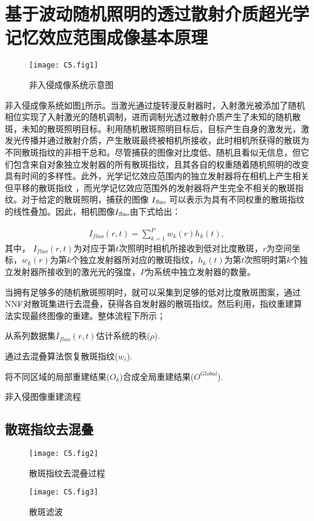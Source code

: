 \section{基于波动随机照明的透过散射介质超光学记忆效应范围成像基本原理}

\begin{figure}[htp]
	\centering
	\texttt{[image: C5.fig1]}
	\caption{非入侵成像系统示意图}
	\label{fig:5.1}
\end{figure}

非入侵成像系统如图\ref{fig:5.1}所示。当激光通过旋转漫反射器时，入射激光被添加了随机相位实现了入射激光的随机调制，进而调制光透过散射介质产生了未知的随机散斑，未知的散斑照明目标。利用随机散斑照明目标后，目标产生自身的激发光，激发光传播并通过散射介质，产生散斑最终被相机所接收，此时相机所获得的散斑为不同散斑指纹的非相干总和。尽管捕获的图像对比度低、随机且看似无信息，但它们包含来自对象独立发射器的所有散斑指纹，且其各自的权重随着随机照明的改变具有时间的多样性。此外，光学记忆效应范围内的独立发射器将在相机上产生相关但平移的散斑指纹 \cite{Freund1988}，而光学记忆效应范围外的发射器将产生完全不相关的散斑指纹。对于给定的散斑照明，捕获的图像 $I_{\textsl{fluo}}$ 可以表示为具有不同权重的散斑指纹的线性叠加。因此，相机图像$I_{\textsl{fluo}}$由下式给出：

\begin{equation}
\begin{aligned}
I_{fluo}(r,t) = \sum^{P}_{k=1} w_{k}(r) h_{k}(t),
\label{eq:5.1}
\end{aligned}
\end{equation}
其中， $I_{fluo}(r,t)$为对应于第$t$次照明时相机所接收到低对比度散斑，$r$为空间坐标，$w_{k}(r)$为第$k$个独立发射器所对应的散斑指纹，$h_{k}(t)$为第$t$次照明时第$k$个独立发射器所接收到的激光光的强度，$P$为系统中独立发射器的数量。

当拥有足够多的随机散斑照明时，就可以采集到足够的低对比度散斑图案，通过NNF对散斑集进行去混叠，获得各自发射器的散斑指纹。然后利用，指纹重建算法实现最终图像的重建。整体流程下所示；
\begin{algorithm2e}[h!]
\DontPrintSemicolon
\SetAlgoLined
{}
从系列数据集$I_{fluo}(r,t)$估计系统的秩($\rho$).\;

通过去混叠算法恢复散斑指纹($w_{i}$).\;


将不同区域的局部重建结果($O_{k}$)合成全局重建结果($O^{Global}$).\;

\caption{非入侵图像重建流程}
\label{alg:a1}
\end{algorithm2e}

\subsection{散斑指纹去混叠}


\begin{figure}[htp]
	\centering
	\texttt{[image: C5.fig2]}
	\caption{散斑指纹去混叠过程}
	\label{fig:5.2}
\end{figure}

\begin{figure}[htp]
	\centering
	\texttt{[image: C5.fig3]}
	\caption{散斑滤波}
	\label{fig:5.3}
\end{figure}
